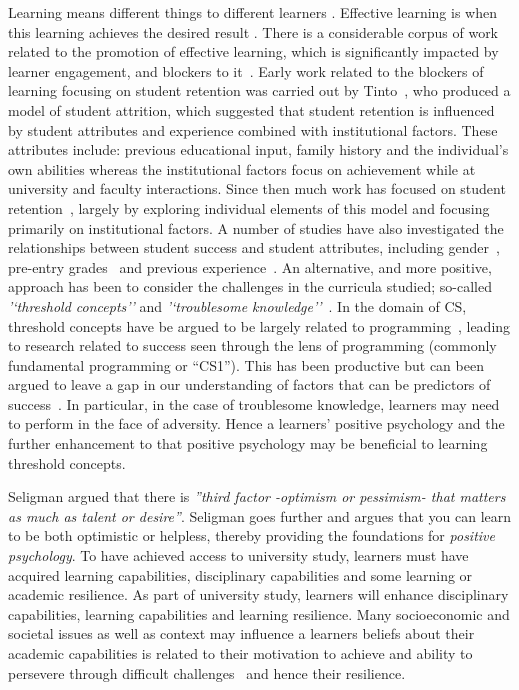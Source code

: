 \documentclass[sigconf]{acmart}
\begin{document}
Learning means different things to different learners \cite{saljo1979learning, Ramsden1992}. Effective learning is when this learning achieves the desired result \cite{kolb2014}. There is a considerable corpus of work related to the promotion of effective learning, which is significantly impacted by learner engagement, and blockers to it~\cite{kolb2014, Ramsden1992}. Early work related to the blockers of learning focusing on student retention was carried out by Tinto~\cite{Tinto1975}, who produced a model of student attrition, which suggested that student retention is influenced by student attributes and experience combined with institutional factors. These attributes include: previous educational input, family history and the individual's own abilities whereas the institutional factors focus on achievement while at university and faculty interactions. Since then much work has focused on student retention~\cite{Barbera2017,Chen2012}, largely by exploring individual elements of this model and focusing primarily on institutional factors. A number of studies have also investigated the relationships between student success and student attributes, including gender~\cite{Lishinski:2016:LPG:2960310.2960329}, pre-entry grades~\cite{Peterson1979} and previous experience~\cite{Ramalingam:2004:SMM:1026487.1008042}. An alternative, and more positive, approach has been to consider the challenges in the curricula studied; so-called {\em'`threshold concepts''} and {\em'`troublesome knowledge''}~\cite{Land2012}. In the domain of CS, threshold concepts have be argued to be largely related to programming~\cite{Sanders:2016:TCC:2999541.2999546}, leading to research related to success seen through the lens of programming (commonly fundamental programming or ``CS1''). This has been productive but can been argued to leave a gap in our understanding of factors that can be predictors of success~\cite{Liao:2019:EVD:3287324.3287407,Liao:2016:LEI:2960310.2960315,Castro-Wunsch:2017:ENN:3017680.3017792,Quille:2018:PPS:3197091.3197101}. In particular, in the case of troublesome knowledge, learners may need to perform in the face of adversity. Hence a learners' positive psychology and the further enhancement to that positive psychology may be beneficial to learning threshold concepts.

Seligman argued that there is {\em''third factor -optimism or pessimism- that matters as much as talent or desire''}\cite[p.~13]{Seligman90}. Seligman goes further and argues that you can learn to be both optimistic or helpless, thereby providing the foundations for {\em positive psychology}. To have achieved access to university study, learners must have acquired learning capabilities, disciplinary capabilities and some learning or academic resilience. As part of university study, learners will enhance disciplinary capabilities, learning capabilities and learning resilience.  Many socioeconomic and societal issues as well as context may influence a learners beliefs about their academic capabilities is related to their motivation to achieve and ability to persevere through difficult challenges~\cite{ZIMMERMAN200082,Bandura1977} and hence their resilience. 
 
\end{document}

